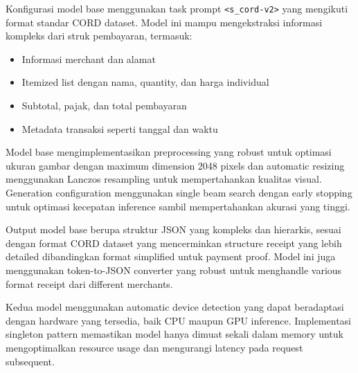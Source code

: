 Konfigurasi model base menggunakan task prompt \texttt{<s\_cord-v2>} yang mengikuti format standar CORD dataset. Model ini mampu mengekstraksi informasi kompleks dari struk pembayaran, termasuk:
\begin{itemize}
    \item Informasi merchant dan alamat
    \item Itemized list dengan nama, quantity, dan harga individual
    \item Subtotal, pajak, dan total pembayaran
    \item Metadata transaksi seperti tanggal dan waktu
\end{itemize}

Model base mengimplementasikan preprocessing yang robust untuk optimasi ukuran gambar dengan maximum dimension 2048 pixels dan automatic resizing menggunakan Lanczos resampling untuk mempertahankan kualitas visual. Generation configuration menggunakan single beam search dengan early stopping untuk optimasi kecepatan inference sambil mempertahankan akurasi yang tinggi.

Output model base berupa struktur JSON yang kompleks dan hierarkis, sesuai dengan format CORD dataset yang mencerminkan structure receipt yang lebih detailed dibandingkan format simplified untuk payment proof. Model ini juga menggunakan token-to-JSON converter yang robust untuk menghandle various format receipt dari different merchants.


Kedua model menggunakan automatic device detection yang dapat beradaptasi dengan hardware yang tersedia, baik CPU maupun GPU inference. Implementasi singleton pattern memastikan model hanya dimuat sekali dalam memory untuk mengoptimalkan resource usage dan mengurangi latency pada request subsequent.
